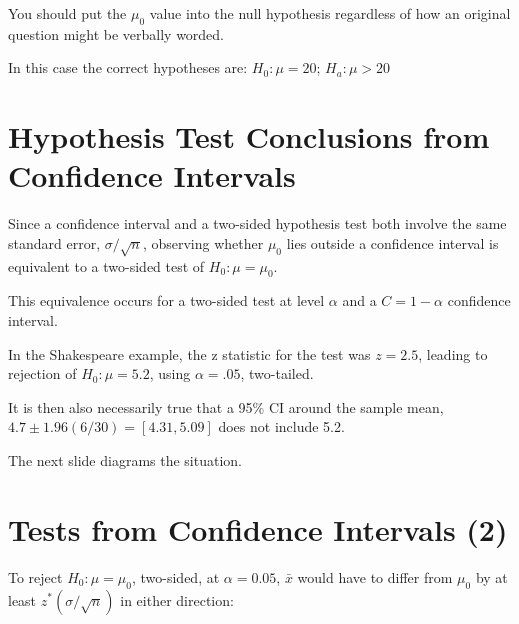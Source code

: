 \documentclass[
  letterpaper,
  DIV=11,
  numbers=noendperiod]{scrreprt}
\begin{document}
You should put the \(\mu_0\) value into the null hypothesis regardless
of how an original question might be verbally worded.

In this case the correct hypotheses are: \(H_0: \mu = 20\);
\(H_a: \mu > 20\)

\section{Hypothesis Test Conclusions from Confidence
Intervals}\label{hypothesis-test-conclusions-from-confidence-intervals}

Since a confidence interval and a two-sided hypothesis test both involve
the same standard error, \(\sigma/\sqrt{n}\), observing whether
\(\mu_0\) lies outside a confidence interval is equivalent to a
two-sided test of \(H_0: \mu = \mu_0\).

This equivalence occurs for a two-sided test at level \(\alpha\) and a
\(C = 1 - \alpha\) confidence interval.

In the Shakespeare example, the z statistic for the test was
\(z = 2.5\), leading to rejection of \(H_0: \mu = 5.2\), using
\(\alpha = .05\), two-tailed.

It is then also necessarily true that a 95\% CI around the sample mean,
\(4.7 \pm 1.96(6/30) = [4.31, 5.09]\) does not include 5.2.

The next slide diagrams the situation.

\section{Tests from Confidence Intervals
(2)}\label{tests-from-confidence-intervals-2}

To reject \(H_0: \mu = \mu_0\), two-sided, at \(\alpha = 0.05\),
\(\bar{x}\) would have to differ from \(\mu_0\) by at least
\(z^*(\sigma/\sqrt{n})\) in either direction:
\end{document}
